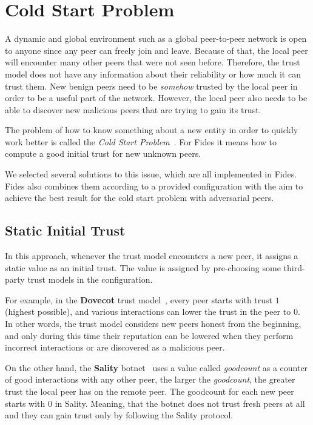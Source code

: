\section{Cold Start Problem}
\label{sec:cold-start-problem}
A dynamic and global environment such as a global peer-to-peer network is open to anyone since any peer can freely join and leave. Because of that, the local peer will encounter many other peers that were not seen before. Therefore, the trust model does not have any information about their reliability or how much it can trust them. 
New benign peers need to be \textit{somehow} trusted by the local peer in order to be a useful part of the network. However, the local peer also needs to be able to discover new malicious peers that are trying to gain its trust.

The problem of how to know something about a new entity in order to quickly work better is called the \textit{Cold Start Problem}~\cite{christensen2014hybrid}. For Fides it means how to compute a good initial trust for new unknown peers. 

We selected several solutions to this issue, which are all implemented in Fides. Fides also combines them according to a provided configuration with the aim to achieve the best result for the cold start problem with adversarial peers.

\subsection{Static Initial Trust}
\label{subsec:static-initial-trust}
In this approach, whenever the trust model encounters a new peer, it assigns a static value as an initial trust. The value is assigned by pre-choosing some third-party trust models in the configuration.

For example, in the \textbf{Dovecot} trust model~\cite{dita}, every peer starts with trust $1$ (highest possible), and various interactions can lower the trust in the peer to $0$. In other words, the trust model considers new peers honest from the beginning, and only during this time their reputation can be lowered when they perform incorrect interactions or are discovered as a malicious peer.

On the other hand, the \textbf{Sality} botnet~\cite{falliere2011sality} uses a value called \textit{goodcount} as a counter of good interactions with any other peer, the larger the \textit{goodcount}, the greater trust the local peer has on the remote peer. The goodcount for each new peer starts with $0$ in Sality. Meaning, that the botnet does not trust fresh peers at all and they can gain trust only by following the Sality protocol.

